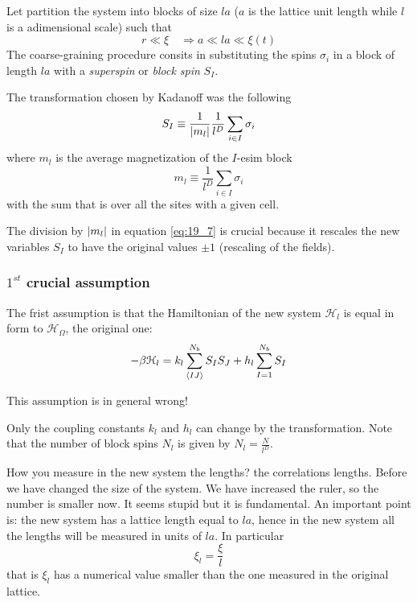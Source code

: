 \documentclass[../main/main.tex]{subfiles}
\begin{document}
Let partition the system into blocks of size \( la \) (\( a \) is the lattice unit length while \( l \) is a adimensional scale) such that
\begin{equation}
  r \ll \xi  \quad \Rightarrow a \ll l a \ll \xi (t)
\end{equation}
The coarse-graining procedure consits in substituting the spins \( \sigma _i \) in a block of length \( la \) with a \emph{superspin} or \emph{block spin} \( S_I \).

The transformation chosen by Kadanoff was the following
\begin{equation}
  S_I \equiv \frac{1}{\abs{m_l} } \frac{1}{l^D} \sum_{i \in I}^{}  \sigma _i
  \label{eq:19_7}
\end{equation}
where \( m_l \) is the average magnetization of the \( I \)-esim block
\begin{equation}
  m_l \equiv \frac{1}{l^D} \sum_{i \in I}^{} \sigma _i
\end{equation}
with the sum that is over all the sites with a given cell.
\begin{remark}
The division by \( \abs{m_l}  \) in equation \eqref{eq:19_7} is crucial because it rescales the new variables \( S_I \) to have the original values \( \pm 1 \) (rescaling of the fields).
\end{remark}

\subsubsection{\(  1^{st} \) crucial assumption}
The frist assumption is that the Hamiltonian of the new system \( \mathcal{H}_l \) is equal in form to \( \mathcal{H}_ \Omega  \), the original one:
\begin{equation}
  - \beta \mathcal{H}_l = k_l \sum_{\expval{IJ} }^{N_b} S_I S_J  + h_l \sum_{I=1}^{N_b} S_I
\end{equation}
\begin{remark}
This assumption is in general wrong!
\end{remark}
Only the coupling constants \( k_l \) and \( h_l \) can change by the transformation. Note that the number of block spins \( N_l \) is given by \(   N_l = \frac{N}{l^D} \).

How you measure in the new system the lengths? the correlations lengths. Before we have changed the size of the system. We have increased the ruler, so the number is smaller now. It seems stupid but it is fundamental.
An important point is: the new system has a lattice length equal to \( la \), hence in the new system all the lengths will be measured in units of \( la \). In particular
\begin{equation}
  \xi _l = \frac{\xi }{l}
\end{equation}
that is \( \xi _l \) has a numerical value smaller than the one measured in the original lattice.
\end{document}
